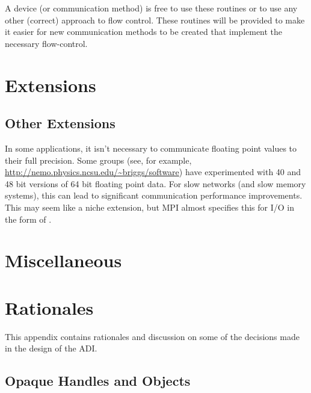 \documentclass{article}
\let\findex=\index
\begin{document}
A device (or communication method) is free to use these routines or to
use any other (correct) approach to flow control.  These routines will
be provided to make it easier for new communication methods to be
created that implement the necessary flow-control.

\section{Extensions}


\subsection{Other Extensions}
In some applications, it isn't necessary to communicate floating point values
to their full precision.  Some groups (see, for example,
\url{http://nemo.physics.ncsu.edu/~briggs/software}) have experimented with 40
and 48 bit versions of 64 bit floating point data.  For slow networks (and
slow memory systems), this can lead to significant communication performance
improvements.  This may seem like a niche extension, but MPI almost specifies
this for I/O in the form of
\findex{MPI_Register_datarep}.   

\openin{}
\ifeof\testfile\else
\section{Miscellaneous}

\fi
\closein\testfile

\appendix
\section{Rationales}
\label{sec:rationales}
This appendix contains rationales and discussion on some of the
decisions made in the design of the ADI.

\subsection{Opaque Handles and Objects}
\end{document}
